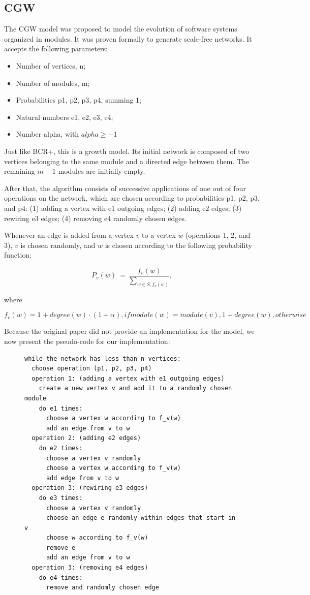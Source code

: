 \subsection{CGW}

The CGW model \cite{Chen2008} was proposed to model the evolution of software
systems organized in modules. It was proven formally to generate scale-free
networks.  It accepts the following parameters:

\begin{itemize}
\item Number of vertices, n;
\item Number of modules, m;
\item Probabilities p1, p2, p3, p4, summing 1;
\item Natural numbers e1, e2, e3, e4;
\item Number alpha, with $alpha \ge -1$
\end{itemize}

Just like BCR+, this is a growth model. Its initial network is composed of two
vertices belonging to the same module and a directed edge between them. The
remaining $m - 1$ modules are initially empty. 

After that, the algorithm consists of successive applications of one out of four
operations on the network, which are chosen according to probabilities p1, p2,
p3, and p4: 
(1) adding a vertex with e1 outgoing edges; 
(2) adding e2 edges;
(3) rewiring e3 edges;
(4) removing e4 randomly chosen edges.

Whenever an edge is added from a vertex $v$ to a vertex $w$ (operations 1, 2,
and 3), $v$ is chosen randomly, and $w$ is chosen according to the following
probability function:

$$
  P_v(w) ~=~ \frac{ f_v(w) }{ \sum_{w \in S, f_v(w)} },
$$

where

$$
f_v(w) = 1 + degree(w) \cdot (1 + \alpha), if module(w) = module(v)
, 1 + degree(w), otherwise
$$

Because the original paper did not provide an implementation for the model, we
now present the pseudo-code for our implementation:

\begin{figure}
\begin{verbatim}
while the network has less than n vertices:
  choose operation (p1, p2, p3, p4)
  operation 1: (adding a vertex with e1 outgoing edges)
    create a new vertex v and add it to a randomly chosen module
    do e1 times:
      choose a vertex w according to f_v(w)
      add an edge from v to w
  operation 2: (adding e2 edges)
    do e2 times:
      choose a vertex v randomly
      choose a vertex w according to f_v(w)
      add edge from v to w
  operation 3: (rewiring e3 edges)
    do e3 times:
      choose a vertex v randomly
      choose an edge e randomly within edges that start in v
      choose w according to f_v(w)
      remove e
      add an edge from v to w
  operation 3: (removing e4 edges)
    do e4 times:
      remove and randomly chosen edge
\end{verbatim}
\end{figure}

